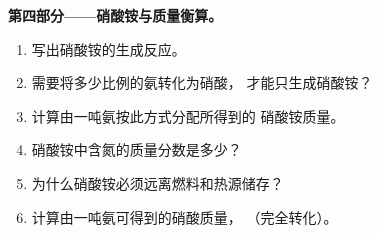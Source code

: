 \begin{problem}
\medskip
\noindent\textbf{第四部分——硝酸铵与质量衡算。}
\begin{enumerate}[resume]
  \item 写出硝酸铵的生成反应。
  \item 需要将多少比例的氨转化为硝酸，
        才能只生成硝酸铵？
  \item 计算由一吨氨按此方式分配所得到的
        硝酸铵质量。
  \item 硝酸铵中含氮的质量分数是多少？
  \item 为什么硝酸铵必须远离燃料和热源储存？
  \item 计算由一吨氨可得到的硝酸质量，
        （完全转化）。
\end{enumerate}
\end{problem}
